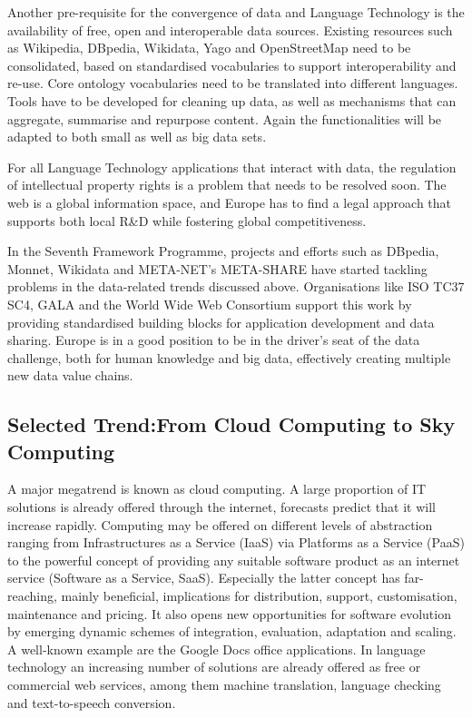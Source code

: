 \documentclass[10pt, plain]{../../metanetpaper}
\begin{document}
\begin{multicols}{2}
Another pre-requisite for the convergence of data and Language Technology is the availability of free, open and interoperable data sources. Existing resources such as Wikipedia, DBpedia, Wikidata, Yago and OpenStreetMap need to be consolidated, based on standardised vocabularies to support interoperability and re-use. Core ontology vocabularies need to be translated into different languages. Tools have to be developed for cleaning up data, as well as mechanisms that can aggregate, summarise and repurpose content. Again the functionalities will be adapted to both small as well as big data sets.

For all Language Technology applications that interact with data, the regulation of intellectual property rights is a problem that needs to be resolved soon. The web is a global information space, and Europe has to find a legal approach that supports both local R\&D while fostering global competitiveness.

In the Seventh Framework Programme, projects and efforts such as DBpedia, Monnet, Wikidata and META-NET's META-SHARE have started tackling problems in the data-related trends discussed above. Organisations like ISO TC37 SC4, GALA and the World Wide Web Consortium  support this work by providing standardised building blocks for application development and data sharing. Europe is in a good position to be in the driver's seat of the data challenge, both for human knowledge and big data, effectively creating multiple new data value chains.

\subsection[Selected Trend: From Cloud Computing to Sky Computing]{Selected Trend:\newline From Cloud Computing to Sky Computing}
\label{sec:cloud-sky-computing}

A major megatrend is known as cloud computing. A large proportion of IT solutions is already offered through the internet, forecasts predict that it will increase rapidly. Computing may be offered on different levels of abstraction ranging from Infrastructures as a Service (IaaS) via Platforms as a Service (PaaS) to the powerful concept of providing any suitable software product as an internet service (Software as a Service, SaaS). Especially the latter concept has far-reaching, mainly beneficial, implications for distribution, support, customisation, maintenance and pricing. It also opens new opportunities for software evolution by emerging dynamic schemes of integration, evaluation, adaptation and scaling. A well-known example are the Google Docs office applications. In language technology an increasing number of solutions are already offered as free or commercial web services, among them machine translation, language checking and text-to-speech conversion.


\end{multicols}
\end{document}
